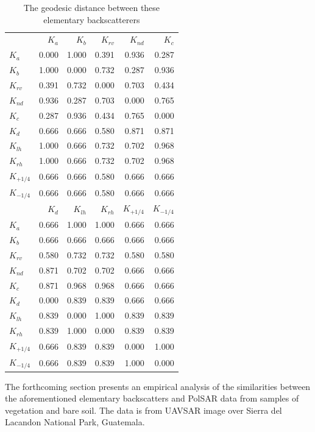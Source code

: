 \documentclass[conference]{IEEEtran}
\begin{document}
\begin{table}[hbt]
\centering
\caption{The geodesic distance between these elementary backscatterers}\label{tab:dist_matrix}
\begin{tabular}{lrrrrr}
\toprule
& $K_{a}$ & $K_{b}$ & $K_{rv}$ & $K_{nd}$ & $K_{c}$\\
\cmidrule(lr){2-6}
$K_{a}$ & 0.000 & 1.000 & 0.391 & 0.936 & 0.287\\
$K_{b}$ & 1.000 & 0.000 & 0.732 & 0.287 & 0.936\\
$K_{rv}$ & 0.391 & 0.732 & 0.000 & 0.703 & 0.434\\
$K_{nd}$ & 0.936 & 0.287 & 0.703 & 0.000 & 0.765\\
$K_{c}$ & 0.287 & 0.936 & 0.434 & 0.765 & 0.000\\
$K_{d}$ & 0.666 & 0.666 & 0.580 & 0.871 & 0.871\\
$K_{lh}$ & 1.000 & 0.666 & 0.732 & 0.702 & 0.968\\
$K_{rh}$ & 1.000 & 0.666 & 0.732 & 0.702 & 0.968\\
$K_{+1/4}$ & 0.666 & 0.666 & 0.580 & 0.666 & 0.666\\
$K_{-1/4}$ & 0.666 & 0.666 & 0.580 & 0.666 & 0.666\\
\midrule
& $K_{d}$ & $K_{lh}$ & $K_{rh}$ & $K_{+1/4}$ & $K_{-1/4}$\\
\cmidrule(lr){2-6}
$K_{a}$ & 0.666 & 1.000 & 1.000 & 0.666 & 0.666\\
$K_{b}$ & 0.666 & 0.666 & 0.666 & 0.666 & 0.666\\
$K_{rv}$ & 0.580 & 0.732 & 0.732 & 0.580 & 0.580\\
$K_{nd}$ & 0.871 & 0.702 & 0.702 & 0.666 & 0.666\\
$K_{c}$ & 0.871 & 0.968 & 0.968 & 0.666 & 0.666\\
$K_{d}$ & 0.000 & 0.839 & 0.839 & 0.666 & 0.666\\
$K_{lh}$ & 0.839 & 0.000 & 1.000 & 0.839 & 0.839\\
$K_{rh}$ & 0.839 & 1.000 & 0.000 & 0.839 & 0.839\\
$K_{+1/4}$ & 0.666 & 0.839 & 0.839 & 0.000 & 1.000\\
$K_{-1/4}$ & 0.666 & 0.839 & 0.839 & 1.000 & 0.000\\
\bottomrule
\end{tabular} 
\end{table}

The forthcoming section presents an empirical analysis of the similarities between the aforementioned elementary backscatters and PolSAR data from samples of vegetation and bare soil. 
The data is from UAVSAR image over Sierra del Lacandon National Park, Guatemala.
\end{document}
